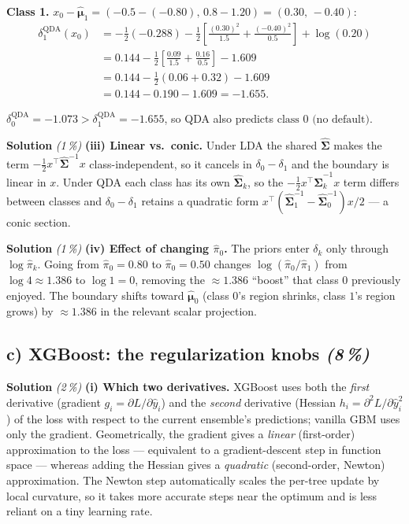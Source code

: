 \documentclass[11pt,a4paper]{article}
\newcommand{\subpoints}[1]{\textit{(#1\,\%)}}
\newcommand{\sol}{\noindent\textbf{Solution}}
\begin{document}
\textbf{Class 1.} $x_0 - \hat{\bm\mu}_1 = (-0.5 - (-0.80),\, 0.8 - 1.20) = (0.30,\, -0.40)$:
\begin{align*}
\delta_1^{\text{QDA}}(x_0) &= -\tfrac{1}{2}(-0.288)
   - \tfrac{1}{2}\!\left[\frac{(0.30)^2}{1.5} + \frac{(-0.40)^2}{0.5}\right] + \log(0.20) \\
   &= 0.144 - \tfrac{1}{2}\!\left[\frac{0.09}{1.5} + \frac{0.16}{0.5}\right] - 1.609 \\
   &= 0.144 - \tfrac{1}{2}(0.06 + 0.32) - 1.609 \\
   &= 0.144 - 0.190 - 1.609 = \boxed{-1.655}.
\end{align*}

$\delta_0^{\text{QDA}} = -1.073 > \delta_1^{\text{QDA}} = -1.655$, so QDA also predicts
$\boxed{\text{class } 0 \text{ (no default)}}$.

\medskip
\sol{} \subpoints{1} \textbf{(iii) Linear vs.\ conic.} Under LDA the shared $\hat{\bm\Sigma}$ makes
the term $-\tfrac{1}{2}x^\top\hat{\bm\Sigma}^{-1}x$ class-independent, so it cancels in
$\delta_0 - \delta_1$ and the boundary is linear in $x$. Under QDA each class has its own
$\hat{\bm\Sigma}_k$, so the $-\tfrac{1}{2}x^\top\hat{\bm\Sigma}_k^{-1}x$ term differs between classes
and $\delta_0 - \delta_1$ retains a quadratic form $x^\top(\hat{\bm\Sigma}_1^{-1} - \hat{\bm\Sigma}_0^{-1})x/2$
--- a conic section.

\medskip
\sol{} \subpoints{1} \textbf{(iv) Effect of changing $\hat\pi_0$.} The priors enter $\delta_k$ only
through $\log\hat\pi_k$. Going from $\hat\pi_0 = 0.80$ to $\hat\pi_0 = 0.50$ changes
$\log(\hat\pi_0/\hat\pi_1)$ from $\log 4 \approx 1.386$ to $\log 1 = 0$, removing the
$\approx 1.386$ ``boost'' that class $0$ previously enjoyed. The boundary shifts toward $\hat{\bm\mu}_0$
(class $0$'s region shrinks, class $1$'s region grows) by $\approx 1.386$ in the relevant scalar
projection.

\subsection*{c) XGBoost: the regularization knobs \subpoints{8}}

\sol{} \subpoints{2} \textbf{(i) Which two derivatives.} XGBoost uses both the \emph{first}
derivative (gradient $g_i = \partial L/\partial\hat y_i$) and the \emph{second} derivative
(Hessian $h_i = \partial^2 L/\partial\hat y_i^2$) of the loss with respect to the current
ensemble's predictions; vanilla GBM uses only the gradient. Geometrically, the gradient gives a
\emph{linear} (first-order) approximation to the loss --- equivalent to a gradient-descent step
in function space --- whereas adding the Hessian gives a \emph{quadratic} (second-order, Newton)
approximation. The Newton step automatically scales the per-tree update by local curvature, so it
takes more accurate steps near the optimum and is less reliant on a tiny learning rate.
\end{document}
